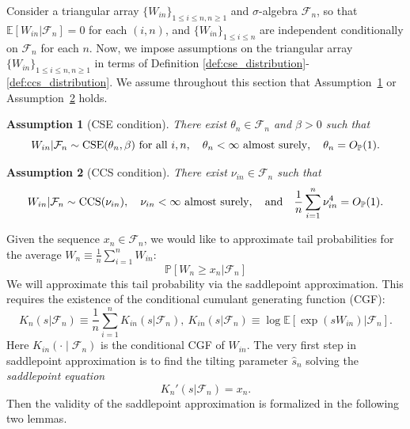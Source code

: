\documentclass[12pt]{article}
\newtheorem{assumption}{Assumption}
\theoremstyle{definition}
\def\P{\mathbb{P}}
\def\P{\mathbb{P}}
\newcommand{\E}{\mathbb E}								%
\renewcommand{\P}{\mathbb{P}}							%
\begin{document}
Consider a triangular array $\{W_{in}\}_{1 \leq i \leq n, n \geq 1}$ and $\sigma$-algebra $\mathcal{F}_n$, so that $\E[W_{in}|\mathcal{F}_n] = 0$ for each $(i, n)$, and $\{W_{in}\}_{1 \leq i \leq n}$ are independent conditionally on $\mathcal{F}_n$ for each $n$. Now, we impose assumptions on the triangular array $\{W_{in}\}_{1 \leq i \leq n, n \geq 1}$ in terms of Definition \ref{def:cse_distribution}-\ref{def:ccs_distribution}. We assume throughout this section that Assumption~\ref{assu:cse} or Assumption~\ref{assu:ccs} holds.
\begin{assumption}[CSE condition]\label{assu:cse}
There exist $\theta_n \in \mathcal F_n$ and $\beta > 0$ such that 
\begin{equation}\label{eq:cse_condition}
W_{in}|\mathcal F_n \sim \textnormal{CSE}(\theta_n, \beta) \text{ for all } i, n, \quad \theta_n < \infty \text{ almost surely}, \quad \theta_n = O_{\P}(1).
\end{equation}
\end{assumption}
\begin{assumption}[CCS condition]\label{assu:ccs}
There exist $\nu_{in} \in \mathcal F_n$ such that 
\begin{align}\label{eq:ccs_condition}
W_{in}|\mathcal F_n \sim \textnormal{CCS}(\nu_{in}), \quad \nu_{in}<\infty\ \text{almost surely}, \quad \text{and} \quad \frac{1}{n}\sum_{i=1}^n \nu_{in}^4=O_{\P}(1).
\end{align}
\end{assumption}

Given the sequence $x_n\in\mathcal{F}_n$, we would like to approximate tail probabilities for the average $W_n\equiv \frac{1}{n}\sum_{i=1}^n W_{in}$:
\begin{equation*}
	\P[W_n\geq x_n|\mathcal{F}_n]
\end{equation*}
We will approximate this tail probability via the saddlepoint approximation. This requires the existence of the conditional cumulant generating function (CGF):
\begin{equation*}
  K_n(s|\mathcal{F}_n) \equiv \frac{1}{n}\sum_{i=1}^n K_{in}(s|\mathcal{F}_n),\ K_{in}(s|\mathcal{F}_n)\equiv \log \E[\exp(sW_{in})|\mathcal{F}_n].
\end{equation*}
Here $K_{in}(\cdot\mid\mathcal{F}_n)$ is the conditional CGF of $W_{in}$. The very first step in saddlepoint approximation is to find the tilting parameter $\hat s_n$ solving the \textit{saddlepoint equation}
\begin{equation}\label{eq:saddlepoint-equation}
	K_n'(s|\mathcal{F}_n)=x_n.
\end{equation}
Then the validity of the saddlepoint approximation is formalized in the following two lemmas.
\end{document}
